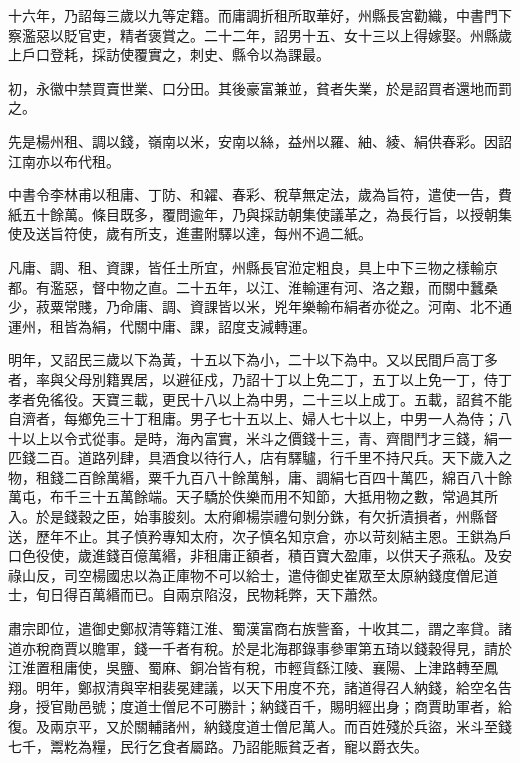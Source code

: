 \begin{pinyinscope}
 十六年，乃詔每三歲以九等定籍。而庸調折租所取華好，州縣長宮勸織，中書門下察濫惡以貶官吏，精者褒賞之。二十二年，詔男十五、女十三以上得嫁娶。州縣歲上戶口登耗，採訪使覆實之，刺史、縣令以為課最。



 初，永徽中禁買賣世業、口分田。其後豪富兼並，貧者失業，於是詔買者還地而罰之。



 先是楊州租、調以錢，嶺南以米，安南以絲，益州以羅、紬、綾、絹供春彩。因詔江南亦以布代租。



 中書令李林甫以租庸、丁防、和糴、春彩、稅草無定法，歲為旨符，遣使一告，費紙五十餘萬。條目既多，覆問逾年，乃與採訪朝集使議革之，為長行旨，以授朝集使及送旨符使，歲有所支，進畫附驛以達，每州不過二紙。



 凡庸、調、租、資課，皆任土所宜，州縣長官涖定粗良，具上中下三物之樣輸京都。有濫惡，督中物之直。二十五年，以江、淮輸運有河、洛之艱，而關中蠶桑少，菽粟常賤，乃命庸、調、資課皆以米，兇年樂輸布絹者亦從之。河南、北不通運州，租皆為絹，代關中庸、課，詔度支減轉運。



 明年，又詔民三歲以下為黃，十五以下為小，二十以下為中。又以民間戶高丁多者，率與父母別籍異居，以避征戍，乃詔十丁以上免二丁，五丁以上免一丁，侍丁孝者免徭役。天寶三載，更民十八以上為中男，二十三以上成丁。五載，詔貧不能自濟者，每鄉免三十丁租庸。男子七十五以上、婦人七十以上，中男一人為侍；八十以上以令式從事。是時，海內富實，米斗之價錢十三，青、齊間鬥才三錢，絹一匹錢二百。道路列肆，具酒食以待行人，店有驛驢，行千里不持尺兵。天下歲入之物，租錢二百餘萬緡，粟千九百八十餘萬斛，庸、調絹七百四十萬匹，綿百八十餘萬屯，布千三十五萬餘端。天子驕於佚樂而用不知節，大抵用物之數，常過其所入。於是錢穀之臣，始事朘刻。太府卿楊崇禮句剝分銖，有欠折漬損者，州縣督送，歷年不止。其子慎矜專知太府，次子慎名知京倉，亦以苛刻結主恩。王鉷為戶口色役使，歲進錢百億萬緡，非租庸正額者，積百寶大盈庫，以供天子燕私。及安祿山反，司空楊國忠以為正庫物不可以給士，遣侍御史崔眾至太原納錢度僧尼道士，旬日得百萬緡而已。自兩京陷沒，民物耗弊，天下蕭然。



 肅宗即位，遣御史鄭叔清等籍江淮、蜀漢富商右族訾畜，十收其二，謂之率貸。諸道亦稅商賈以贍軍，錢一千者有稅。於是北海郡錄事參軍第五琦以錢穀得見，請於江淮置租庸使，吳鹽、蜀麻、銅冶皆有稅，市輕貨繇江陵、襄陽、上津路轉至鳳翔。明年，鄭叔清與宰相裴冕建議，以天下用度不充，諸道得召人納錢，給空名告身，授官勛邑號；度道士僧尼不可勝計；納錢百千，賜明經出身；商賈助軍者，給復。及兩京平，又於關輔諸州，納錢度道士僧尼萬人。而百姓殘於兵盜，米斗至錢七千，鬻籺為糧，民行乞食者屬路。乃詔能賑貧乏者，寵以爵衣失。




\end{pinyinscope}
